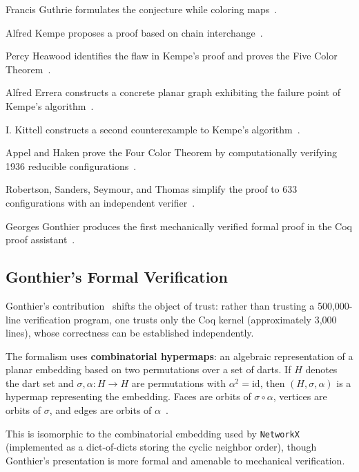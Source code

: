 \documentclass[12pt,letterpaper]{article}
\theoremstyle{plain}
\theoremstyle{definition}
\theoremstyle{remark}
\begin{document}
\begin{description}[leftmargin=2cm]
    \item[1852] Francis Guthrie formulates the conjecture while coloring
        maps~\cite{wilson2002}.
    \item[1879] Alfred Kempe proposes a proof based on chain
        interchange~\cite{kempe1879}.
    \item[1890] Percy Heawood identifies the flaw in Kempe's proof and proves
        the Five Color Theorem~\cite{heawood1890}.
    \item[1921] Alfred Errera constructs a concrete planar graph exhibiting the
        failure point of Kempe's algorithm~\cite{errera1921}.
    \item[1935] I. Kittell constructs a second counterexample to Kempe's
        algorithm~\cite{kittell1935}.
    \item[1976] Appel and Haken prove the Four Color Theorem by computationally
        verifying 1936 reducible configurations~\cite{appelhaken1977}.
    \item[1997] Robertson, Sanders, Seymour, and Thomas simplify the proof to
        633 configurations with an independent verifier~\cite{robertson1997}.
    \item[2005] Georges Gonthier produces the first mechanically verified formal
        proof in the Coq proof assistant~\cite{gonthier2008}.
\end{description}

\subsection{Gonthier's Formal Verification}

Gonthier's contribution~\cite{gonthier2008} shifts the object of trust: rather
than trusting a 500,000-line verification program, one trusts only the Coq
kernel (approximately 3,000 lines), whose correctness can be established
independently.

The formalism uses \textbf{combinatorial hypermaps}: an algebraic representation
of a planar embedding based on two permutations over a set of darts. If $H$
denotes the dart set and $\sigma, \alpha: H \to H$ are permutations with
$\alpha^2 = \mathrm{id}$, then $(H, \sigma, \alpha)$ is a hypermap representing
the embedding. Faces are orbits of $\sigma \circ \alpha$, vertices are orbits of
$\sigma$, and edges are orbits of $\alpha$~\cite{gonthier2008}.

This is isomorphic to the combinatorial embedding used by \texttt{NetworkX}
(implemented as a dict-of-dicts storing the cyclic neighbor order), though
Gonthier's presentation is more formal and amenable to mechanical verification.
\end{document}
